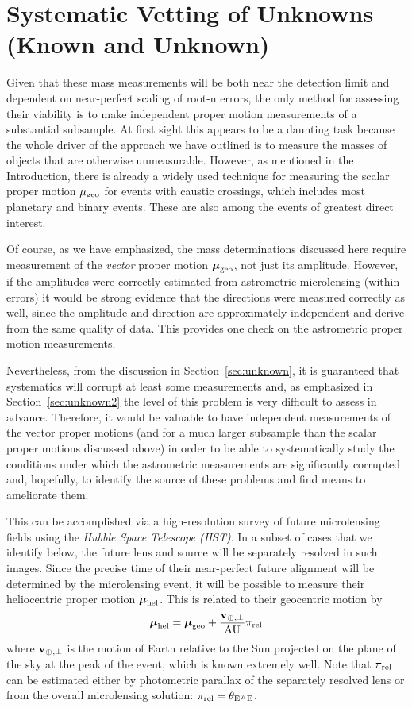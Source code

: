 \documentclass[12pt,preprint]{aastex}
\newcommand{\bdv}[1]{\mbox{\boldmath$#1$}}
\def\au{{\rm AU}}
\def\rel{{\rm rel}}
\def\geo{{\rm geo}}
\def\hel{{\rm hel}}
\def\e{{\rm E}}
\def\bmu{{\bdv\mu}}
\begin{document}
\section{{Systematic Vetting of Unknowns (Known and Unknown)}
\label{sec:discuss}}

Given that these mass measurements will be both near the detection limit
and dependent on near-perfect scaling of root-n errors, the only method
for assessing their viability is to make independent proper motion 
measurements of a substantial subsample.  At first sight this appears to
be a daunting task because the whole driver of the approach we have outlined is
to measure the masses of objects that are otherwise unmeasurable.
However, as mentioned in the Introduction, there is already a widely used 
technique for measuring the scalar proper motion $\mu_\geo$ for events with
caustic crossings, which includes most planetary and binary events.
These are also among the events of greatest direct interest.  

Of course, as we have emphasized, the mass determinations discussed here
require measurement of the {\it vector} proper motion $\bmu_\geo$, not
just its amplitude.  However, if the amplitudes were correctly
estimated from astrometric microlensing (within errors) it would
be strong evidence that the directions were measured correctly as
well, since the amplitude and direction are approximately independent
and derive from the same quality of data.
This provides one check on the astrometric proper motion measurements.

Nevertheless, from the discussion in Section~\ref{sec:unknown}, it is
guaranteed that systematics will corrupt at least some measurements and,
as emphasized in Section~\ref{sec:unknown2} the level of this problem
is very difficult to assess in advance.  Therefore, it would be valuable
to have independent measurements of the vector proper motions (and for
a much larger subsample than the scalar proper motions discussed above)
in order to be able to systematically study
the conditions under which the astrometric measurements are significantly
corrupted and, hopefully, to identify the source of these problems and
find means to ameliorate them.

This can be accomplished via a high-resolution survey of future
microlensing fields using the {\it Hubble Space Telescope (HST)}.  In a 
subset of cases that we identify below, the future lens and source
will be separately resolved in such images.  Since the precise time of their
near-perfect future alignment will be determined by the microlensing
event, it will be possible to measure their heliocentric proper motion
$\bmu_\hel$.  This is related to their geocentric motion by
\begin{equation}
\bmu_\hel = \bmu_\geo + {{\bf v}_{\oplus,\perp}\over \au}\pi_{\rm rel}
\label{eqn:helgeo}
\end{equation}
where ${\bf v}_{\oplus,\perp}$ is the motion of Earth relative to the Sun
projected on the plane of the sky at the peak of the event, which is
known extremely well. Note that $\pi_\rel$ can be estimated either
by photometric parallax of the separately resolved lens or from the
overall microlensing solution: $\pi_\rel = \theta_\e\pi_\e$.
\end{document}
